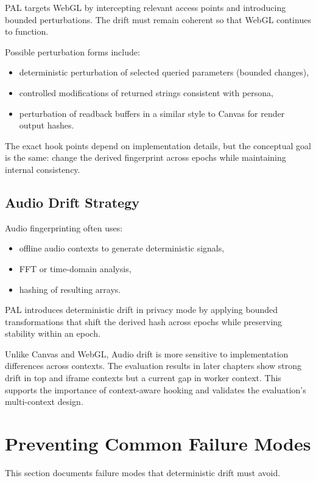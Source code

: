 \documentclass[11pt]{report}
\begin{document}
PAL targets WebGL by intercepting relevant access points and introducing bounded perturbations. The drift must remain coherent so that WebGL continues to function.

Possible perturbation forms include:
\begin{itemize}
    \item deterministic perturbation of selected queried parameters (bounded changes),
    \item controlled modifications of returned strings consistent with persona,
    \item perturbation of readback buffers in a similar style to Canvas for render output hashes.
\end{itemize}

The exact hook points depend on implementation details, but the conceptual goal is the same: change the derived fingerprint across epochs while maintaining internal consistency.

\subsection{Audio Drift Strategy}

Audio fingerprinting often uses:
\begin{itemize}
    \item offline audio contexts to generate deterministic signals,
    \item FFT or time-domain analysis,
    \item hashing of resulting arrays.
\end{itemize}

PAL introduces deterministic drift in privacy mode by applying bounded transformations that shift the derived hash across epochs while preserving stability within an epoch.

Unlike Canvas and WebGL, Audio drift is more sensitive to implementation differences across contexts. The evaluation results in later chapters show strong drift in top and iframe contexts but a current gap in worker context. This supports the importance of context-aware hooking and validates the evaluation’s multi-context design.

\section{Preventing Common Failure Modes}

This section documents failure modes that deterministic drift must avoid.
\end{document}
